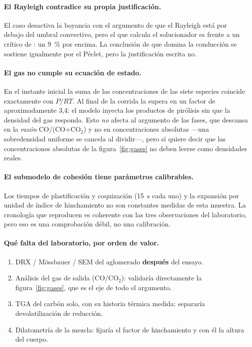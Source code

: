 \documentclass[11pt,a4paper]{article}
\begin{document}
\paragraph{El Rayleigh contradice su propia justificación.} El caso desactiva la
boyancia con el argumento de que el Rayleigh está por debajo del umbral
convectivo, pero el que calcula el solucionador es
\datRa{} frente a un crítico de
\datRaCritico{}: un \SI{9}{\percent} por encima. La
conclusión de que domina la conducción se sostiene igualmente por el Péclet,
pero la justificación escrita no.

\paragraph{El gas no cumple su ecuación de estado.} En el instante inicial la
suma de las concentraciones de las siete especies coincide exactamente con
$P/RT$. Al final de la corrida la supera en un factor de aproximadamente 3,4:
el modelo inyecta los productos de pirólisis sin que la densidad del gas
responda. Esto \emph{no} afecta al argumento de las fases, que descansa en la
\emph{razón} CO/(CO+CO$_2$) y no en concentraciones absolutas ---una
sobredensidad uniforme se cancela al dividir---, pero sí quiere decir que las
concentraciones absolutas de la figura~\ref{fig:gases} no deben leerse como
densidades reales.

\paragraph{El submodelo de cohesión tiene parámetros calibrables.} Los tiempos
de plastificación y coquización (\SI{15}{\second} cada uno) y la expansión por
unidad de índice de hinchamiento no son constantes medidas de esta muestra. La
cronología que reproducen es coherente con las tres observaciones del
laboratorio, pero eso es una comprobación débil, no una calibración.

\paragraph{Qué falta del laboratorio, por orden de valor.}
\begin{enumerate}[nosep,leftmargin=*]
  \item DRX / Mössbauer / SEM del aglomerado \textbf{después} del ensayo.
  \item Análisis del gas de salida (CO/CO$_2$): validaría directamente la
        figura~\ref{fig:gases}, que es el eje de todo el argumento.
  \item TGA del carbón solo, con su historia térmica medida: separaría
        devolatilización de reducción.
  \item Dilatometría de la mezcla: fijaría el factor de hinchamiento y con él
        la altura del cuerpo.
\end{enumerate}
\end{document}
